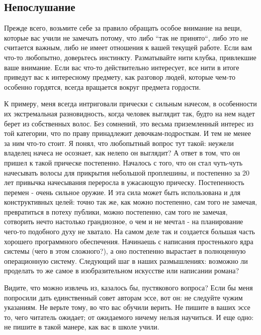 \documentclass[ebook,12pt,oneside,openany]{memoir}
\begin{document}
\subsection{Непослушание}

Прежде всего, возьмите себе за правило обращать особое внимание на
вещи, которые вас учили не замечать потому, что либо ``так не
принято``, либо это не считается важным, либо не имеет отношения к
вашей текущей работе. Если вам что-то любопытно, доверьтесь инстинкту.
Разматывайте нити клубка, привлекшие ваше внимание. Если вас что-то
действительно интересует, все нити в итоге приведут вас к интересному
предмету, как разговор людей, которые чем-то особенно гордятся, всегда
вращается вокруг предмета гордости. \newline

К примеру, меня всегда интриговали прически с сильным начесом, в
особенности их экстремальная разновидность, когда человек выглядит
так, будто на нем надет берет из собственных волос. Без сомнений, это
весьма приземленный интерес из той категории, что по праву принадлежит
девочкам-подросткам. И тем не менее за ним что-то стоит. Я понял, что
любопытный вопрос тут такой: неужели владелец начеса не осознает, как
нелепо он выглядит? А ответ в том, что он пришел к такой прическе
постепенно. Началось с того, что он стал чуть-чуть начесывать волосы
для прикрытия небольшой проплешины, и постепенно за 20 лет привычка
начесывания переросла в ужасающую прическу. Постепенность перемен -
очень сильное оружие. И эта сила может быть использована и для
конструктивных целей: точно так же, как можно постепенно, сам того не
замечая, превратиться в потеху публики, можно постепенно, сам того не
замечая, сотворить нечто настолько грандиозное, о чем и не мечтал - на
планирование чего-то подобного духу не хватало. На самом деле так и
создается большая часть хорошего программного обеспечения. Начинаешь с
написания простенького ядра системы (чего в этом сложного?), а оно
постепенно вырастает в полноценную операционную систему. Следующий шаг
в наших размышлениях: возможно ли проделать то же самое в
изобразительном искусстве или написании романа? \newline

Видите, что можно извлечь из, казалось бы, пустякового вопроса? Если
бы меня попросили дать единственный совет авторам эссе, вот он: не
следуйте чужим указаниям. Не верьте тому, во что вас обучили верить.
Не пишите в ваших эссе то, чего читатель ожидает; от ожидаемого ничему
нельзя научиться. И еще одно: не пишите в такой манере, как вас в
школе учили. \newline
\end{document}
